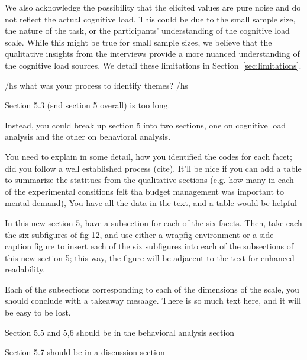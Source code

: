 We also acknowledge the possibility that the elicited values are pure noise and do not reflect the actual cognitive load. This could be due to the small sample size, the nature of the task, or the participants' understanding of the cognitive load scale. While this might be true for small sample sizes, we believe that the qualitative insights from the interviews provide a more nuanced understanding of the cognitive load sources. We detail these limitations in Section~\ref{sec:limitations}.

/hs{ what was your process to identify themes?}
/hs{Section 5.3 (snd section 5 overall) is too long. 

Instead, you could break up section 5 into two sections, one on cognitive  load analysis and the other on behavioral analysis. 

You need to explain in some detail, how you identified the codes for each facet; did you follow a well established process (cite). It'll be nice if you can add a table to summarize the statitucs from the qualitative sections (e.g. how many in each of the experimental consitions felt tha budget management was important to mental demand), You have all the data in the text, and a table would be helpful 

In this new section 5, have a subsection for each of the six facets. Then, take each the six subfigures of fig 12, and use either a wrapfig environment or a side caption figure to insert each of the six subfigures into each of the subsections of this new section 5; this way, the figure will be adjacent to the text for enhanced readability.

Each of the subsections corresponding to each of the dimensions of the scale, you should conclude with a takeaway mesaage. There is so much text here, and it will be easy to be lost.

Section 5.5 and 5,6 should be in the behavioral analysis section

Section 5.7 should be in a discussion section}

